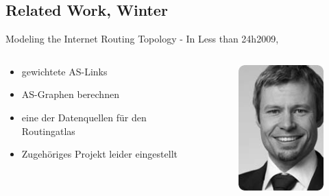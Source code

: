 \documentclass[ngerman,compress,hyperref={bookmarks}]{beamer}
\begin{document}
\subsection{Related Work, Winter}
\begin{frame}{Modeling the Internet Routing Topology - In Less than 24h}{2009, \cite{Winter:2009:MIR:1577959.1577976}}
  \begin{columns}[c]
    \begin{column}{0.5\textwidth}
      \begin{itemize}
        \item gewichtete AS-Links
        \item AS-Graphen berechnen
        \item eine der Datenquellen für den Routingatlas
        \item Zugehöriges Projekt leider eingestellt
      \end{itemize}
    \end{column}
    \begin{column}{0.09\textwidth}
      \begin{figure}
        \label{winter}
        \includegraphics[width=1\textwidth]{images/winter_r}

\end{figure}
\end{column}
\end{columns}
\end{frame}
\end{document}
